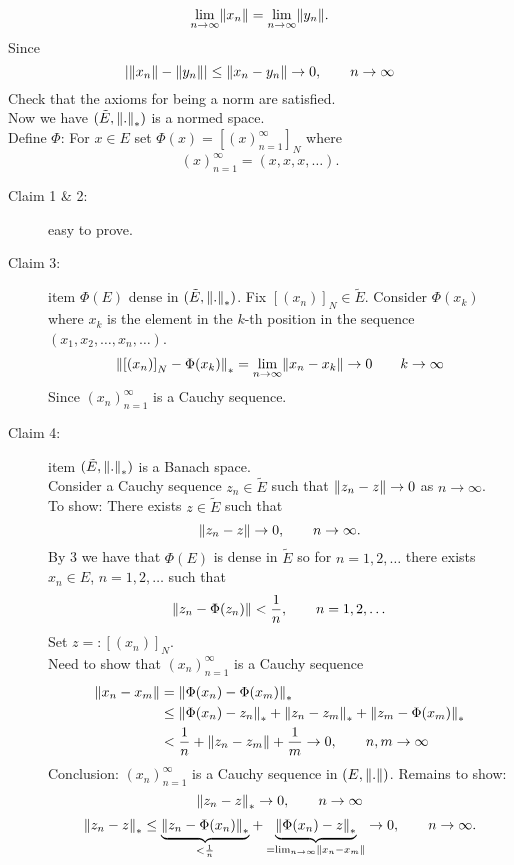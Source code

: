\[
	\lim_{n \to \infty}\norm{x_n} = \lim_{n \to \infty} \norm{y_n}.
\]
Since
\[
	\abs{\norm{x_n}- \norm{y_n}} \leq \norm{x_n-y_n} \to 0, \qquad n \to \infty
\]
Check that the axioms for being a norm are satisfied. \\
Now we have $(\tilde E,\norm{.}_*)$ is a normed space. \\
Define $\Phi$: For $x \in E$ set $\Phi(x) = \left[ (x)_{n=1}^{\infty} \right]_N$ where 
\[
	(x)_{n=1}^{\infty} = (x,x,x, \dots).
\]
\begin{description}
\item[Claim 1 \& 2:] easy to prove. 
\item[Claim 3:] item $\Phi(E)$ dense in $(\tilde E,\norm{.}_*)$. Fix $\left[ (x_n) \right]_N \in \tilde E$. Consider $\Phi(x_k)$ where $x_k$ is the element in the $k$-th position in the sequence $(x_1,x_2, \dots,x_n, \dots)$.
\begin{align*}
	\norm{\left[ (x_n) \right]_N - \Phi(x_k)}_* = \lim_{n \to \infty}\norm{x_n - x_k} \to 0 \qquad k \to \infty
\end{align*}
Since $(x_n)_{n=1}^{\infty}$ is a Cauchy sequence. \\
\item[Claim 4:] item $(\tilde E, \norm{.}_*)$ is a Banach space.\\
Consider a Cauchy sequence $z_n \in \tilde E$ such that $\norm{z_n - z} \to 0$ as $n \to \infty$. \\
To show: There exists $z \in \tilde E$ such that 
\[
	\norm{z_n - z} \to 0, \qquad n \to \infty.
\]
By 3 we have that $\Phi(E)$ is dense in $ \tilde E$ so for $n=1,2,\dots$ there exists $x_n \in E$, $n=1,2,\dots$ such that
\[
	\norm{z_n - \Phi(z_n)} < \frac{1}{n}, \qquad  n=1,2,\dots
\]
Set $z=: \left[ (x_n) \right]_N$. \\
Need to show that $(x_n)_{n=1}^{\infty}$ is a Cauchy sequence
\begin{align*}
	\norm{x_n - x_m} &= \norm{\Phi(x_n)-\Phi(x_m)}_* \\
	& \leq  \norm{\Phi(x_n)- z_n}_* + \norm{z_n-z_m}_* + \norm{z_m - \Phi(x_m)}_* \\
	&< \frac{1}{n} + \norm{z_n-z_m} + \frac{1}{m} \to 0, \qquad n,m \to \infty
\end{align*}
Conclusion: $(x_n)_{n=1}^{\infty}$ is a Cauchy sequence in $(E, \norm{.})$. Remains to show:
\[
	\norm{z_n-z}_* \to 0, \qquad n \to \infty
\]
\[
	\norm{z_n - z}_* \leq \underset{< \frac{1}{n}}{\underbrace{\norm{z_n - \Phi(x_n)}_*}} + \underset{= \lim_{n \to \infty}\norm{x_n-x_m}}{\underbrace{\norm{\Phi(x_n)-z}_*}} \to 0, \qquad n \to \infty.
\]
\end{description}

